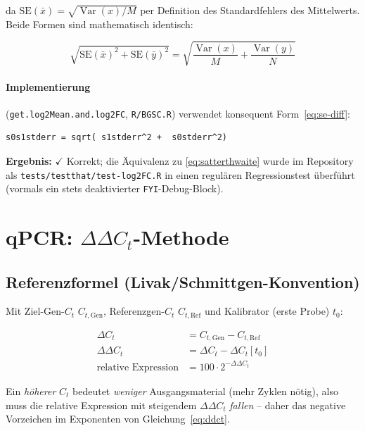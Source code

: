 \documentclass[11pt,a4paper]{article}
\begin{document}
da $\text{SE}(\bar x) = \sqrt{\operatorname{Var}(x)/M}$ per Definition des
Standardfehlers des Mittelwerts. Beide Formen sind mathematisch identisch:

\begin{equation}
\sqrt{\text{SE}(\bar x)^2 + \text{SE}(\bar y)^2}
= \sqrt{\frac{\operatorname{Var}(x)}{M} + \frac{\operatorname{Var}(y)}{N}}
\end{equation}

\paragraph{Implementierung} (\texttt{get.log2Mean.and.log2FC},
\texttt{R/BGSC.R}) verwendet konsequent Form~\eqref{eq:se-diff}:

\begin{lstlisting}
s0s1stderr = sqrt( s1stderr^2 +  s0stderr^2)
\end{lstlisting}

\textbf{Ergebnis:} $\checkmark$ Korrekt; die Äquivalenz zu
\eqref{eq:satterthwaite} wurde im Repository als
\texttt{tests/testthat/test-log2FC.R} in einen regulären Regressionstest
überführt (vormals ein stets deaktivierter \texttt{FYI}-Debug-Block).

\section{qPCR: $\Delta\Delta C_t$-Methode}
\label{sec:qpcr}

\subsection{Referenzformel (Livak/Schmittgen-Konvention)}

Mit Ziel-Gen-$C_t$ $C_{t,\text{Gen}}$, Referenzgen-$C_t$ $C_{t,\text{Ref}}$
und Kalibrator (erste Probe) $t_0$:

\begin{align}
\Delta C_t &= C_{t,\text{Gen}} - C_{t,\text{Ref}} \\
\Delta\Delta C_t &= \Delta C_t - \Delta C_t[t_0] \\
\text{relative Expression} &= 100 \cdot 2^{-\Delta\Delta C_t}
\label{eq:ddct}
\end{align}

Ein \emph{höherer} $C_t$ bedeutet \emph{weniger} Ausgangsmaterial (mehr
Zyklen nötig), also muss die relative Expression mit steigendem
$\Delta\Delta C_t$ \emph{fallen} -- daher das negative Vorzeichen im
Exponenten von Gleichung~\eqref{eq:ddct}.
\end{document}
